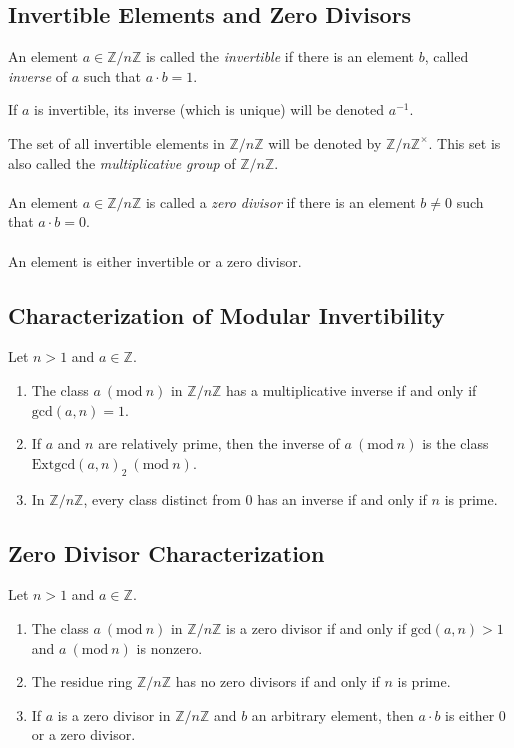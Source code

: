 \documentclass[fleqn]{article}
\begin{document}
\subsection{Invertible Elements and Zero Divisors}
An element $a \in \mathbb{Z}/n\mathbb{Z}$ is called the \textit{invertible} if there
is an element $b$, called \textit{inverse} of $a$ such that $a \cdot b = 1$.

If $a$ is invertible, its inverse (which is unique) will be denoted $a^{-1}$.

The set of all invertible elements in $\mathbb{Z}/n\mathbb{Z}$ will be denoted by
$\mathbb{Z}/n\mathbb{Z}^\times$. This set is also called the \textit{multiplicative group}
of $\mathbb{Z}/n\mathbb{Z}$.\\
\\
An element $a \in \mathbb{Z}/n\mathbb{Z}$ is called a \textit{zero divisor} if there
is an element $b \neq 0$ such that $a \cdot b = 0$.\\
\\
An element is either invertible or a zero divisor.

\subsection{Characterization of Modular Invertibility}
Let $n > 1$ and $a \in \mathbb{Z}$.
\begin{enumerate}
    \item The class $a\ (\text{mod}\ n)$ in $\mathbb{Z}/n\mathbb{Z}$ has a multiplicative
        inverse if and only if $\text{gcd}(a,n) = 1$.
    \item If $a$ and $n$ are relatively prime, then the inverse of $a\ (\text{mod}\ n)$
        is the class $\text{Extgcd}(a,n)_2\ (\text{mod}\ n)$.
    \item In $\mathbb{Z}/n\mathbb{Z}$, every class distinct from $0$ has an inverse
        if and only if $n$ is prime.
\end{enumerate}

\subsection{Zero Divisor Characterization}
Let $n > 1$ and $a \in \mathbb{Z}$.
\begin{enumerate}
    \item The class $a\ (\text{mod}\ n)$ in $\mathbb{Z}/n\mathbb{Z}$ is a zero divisor
        if and only if $\text{gcd}(a,n) > 1$ and $a\ (\text{mod}\ n)$ is nonzero.
    \item The residue ring $\mathbb{Z}/n\mathbb{Z}$ has no zero divisors if and only if $n$ is prime.
    \item If $a$ is a zero divisor in $\mathbb{Z}/n\mathbb{Z}$ and $b$ an arbitrary element,
        then $a \cdot b$ is either $0$ or a zero divisor.
\end{enumerate}
\end{document}
